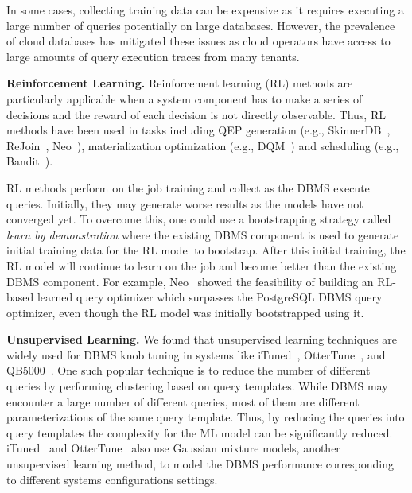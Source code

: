 In some cases, collecting training data can be expensive as it requires executing a large number of queries potentially on large databases.
However, the prevalence of cloud databases has mitigated these issues as cloud operators have access to large amounts of query execution traces from many tenants.

\vspace{2mm}
\noindent \textbf{Reinforcement Learning.} Reinforcement learning (RL) methods are particularly applicable when a system component has to make a series of decisions and the reward of each decision is not directly observable.
Thus, RL methods have been used in tasks including QEP generation (e.g., SkinnerDB~\cite{skinnerdb}, ReJoin~\cite{rejoin}, Neo~\cite{neo}), materialization optimization (e.g., DQM~\cite{dqm}) and scheduling (e.g., Bandit~\cite{bandit}).

RL methods perform on the job training and collect as the DBMS execute queries.
Initially, they may generate worse results as the models have not converged yet.
To overcome this, one could use a bootstrapping strategy called  \textit{learn by demonstration} where the existing DBMS component is used to generate initial training data for the RL model to bootstrap.
After this initial training, the RL model will continue to learn on the job and become better than the existing DBMS component.
For example, Neo~\cite{neo} showed the feasibility of building an RL-based learned query optimizer which surpasses the PostgreSQL DBMS query optimizer, even though the RL model was initially bootstrapped using it.


\vspace{2mm}
\noindent \textbf{Unsupervised Learning.} We found that unsupervised learning techniques are widely used for DBMS knob tuning in systems like iTuned~\cite{ituned}, OtterTune~\cite{ottertune}, and QB5000~\cite{qb5000}.
One such popular technique is to reduce the number of different queries by performing clustering based on query templates.
While DBMS may encounter a large number of different queries, most of them are different parameterizations of the same query template.
Thus, by reducing the queries into query templates the complexity for the ML model can be significantly reduced.
iTuned~\cite{ituned} and OtterTune~\cite{ottertune} also use Gaussian mixture models, another unsupervised learning method, to model the DBMS performance corresponding to different systems configurations settings.
